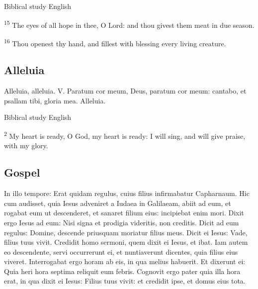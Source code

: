 \begin{englishwitness}{Biblical study English}

\textsuperscript{15} The eyes of all hope in thee, O Lord: and thou givest them meat in due season.

\textsuperscript{16} Thou openest thy hand, and fillest with blessing every living creature.

\end{englishwitness}

\subsection{Alleluia}\label{proper-alleluia}


\begin{latinproper}
Alleluia, alleluia. V. Paratum cor meum, Deus, paratum cor meum: cantabo, et psallam tibi, gloria mea. Alleluia.
\end{latinproper}

\begin{englishwitness}{Biblical study English}

\textsuperscript{2} My heart is ready, O God, my heart is ready: I will sing, and will give praise, with my glory.

\end{englishwitness}


\subsection{Gospel}\label{proper-gospel}


\begin{latinproper}
In illo tempore: Erat quidam regulus, cuius filius infirmabatur Capharnaum. Hic cum audisset, quia Iesus adveniret a Iudaea in Galilaeam, abiit ad eum, et rogabat eum ut descenderet, et sanaret filium eius: incipiebat enim mori. Dixit ergo Iesus ad eum: Nisi signa et prodigia videritis, non creditis. Dicit ad eum regulus: Domine, descende priusquam moriatur filius meus. Dicit ei Iesus: Vade, filius tuus vivit. Credidit homo sermoni, quem dixit ei Iesus, et ibat. Iam autem eo descendente, servi occurrerunt ei, et nuntiaverunt dicentes, quia filius eius viveret. Interrogabat ergo horam ab eis, in qua melius habuerit. Et dixerunt ei: Quia heri hora septima reliquit eum febris. Cognovit ergo pater quia illa hora erat, in qua dixit ei Iesus: Filius tuus vivit: et credidit ipse, et domus eius tota.
\end{latinproper}

